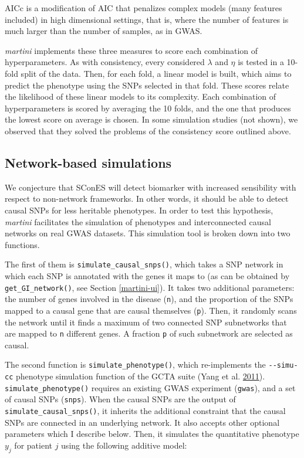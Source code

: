 \documentclass[
  11pt,
]{env/yjiao}
\begin{document}
AICc is a modification of AIC that penalizes complex models (many features included) in high dimensional settings, that is, where the number of features is much larger than the number of samples, as in GWAS.

\emph{martini} implements these three measures to score each combination of hyperparameters. As with consistency, every considered \(\lambda\) and \(\eta\) is tested in a 10-fold split of the data. Then, for each fold, a linear model is built, which aims to predict the phenotype using the SNPs selected in that fold. These scores relate the likelihood of these linear models to its complexity. Each combination of hyperparameters is scored by averaging the 10 folds, and the one that produces the lowest score on average is chosen. In some simulation studies (not shown), we observed that they solved the problems of the consistency score outlined above.

\hypertarget{network-based-simulations}{%
\subsection{Network-based simulations}\label{network-based-simulations}}

We conjecture that SConES will detect biomarker with increased sensibility with respect to non-network frameworks. In other words, it should be able to detect causal SNPs for less heritable phenotypes. In order to test this hypothesis, \emph{martini} facilitates the simulation of phenotypes and interconnected causal networks on real GWAS datasets. This simulation tool is broken down into two functions.

The first of them is \texttt{simulate\_causal\_snps()}, which takes a SNP network in which each SNP is annotated with the genes it maps to (as can be obtained by \texttt{get\_GI\_network()}, see Section \ref{martini-ui}). It takes two additional parameters: the number of genes involved in the disease (\texttt{n}), and the proportion of the SNPs mapped to a causal gene that are causal themselves (\texttt{p}). Then, it randomly scans the network until it finds a maximum of two connected SNP subnetworks that are mapped to \texttt{n} different genes. A fraction \texttt{p} of such subnetwork are selected as causal.

The second function is \texttt{simulate\_phenotype()}, which re-implements the \texttt{-\/-simu-cc} phenotype simulation function of the GCTA suite (Yang et al. \protect\hyperlink{ref-Yang2011}{2011}). \texttt{simulate\_phenotype()} requires an existing GWAS experiment (\texttt{gwas}), and a set of causal SNPs (\texttt{snps}). When the causal SNPs are the output of \texttt{simulate\_causal\_snps()}, it inherits the additional constraint that the causal SNPs are connected in an underlying network. It also accepts other optional parameters which I describe below. Then, it simulates the quantitative phenotype \(y_j\) for patient \(j\) using the following additive model:
\end{document}
